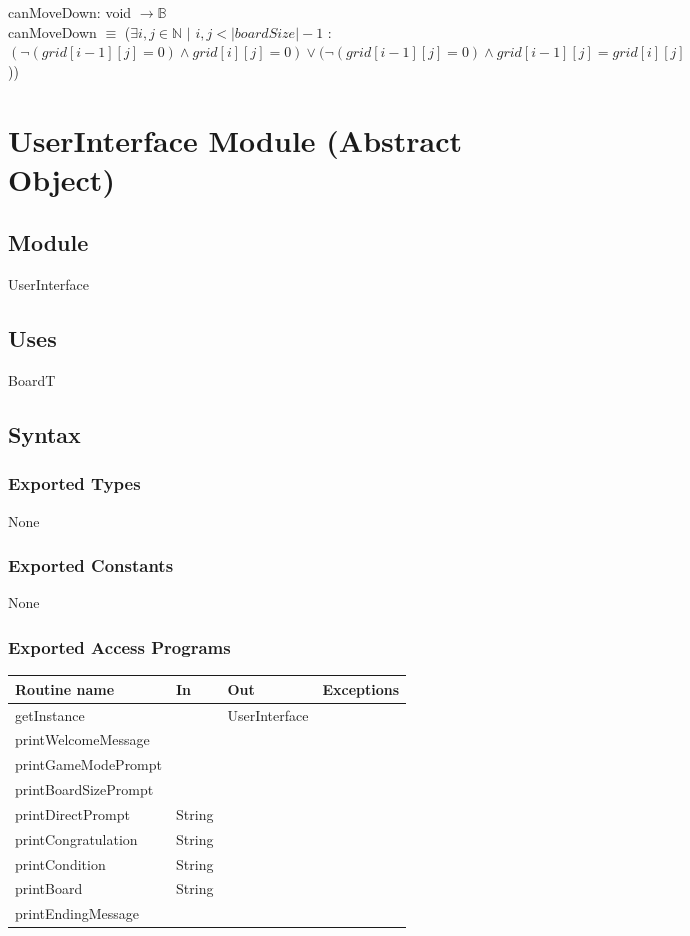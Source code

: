 \documentclass[12pt]{article}
\begin{document}
\noindent canMoveDown: void $\rightarrow \mathbb{B}$  \\
canMoveDown $\equiv$ ($\exists i, j \in \mathbb{N}$ $|$ $i,j < |boardSize|-1$ : $(\lnot(grid[i-1][j]=0) \wedge grid[i][j]=0) \vee (\lnot(grid[i-1][j]=0) \wedge grid[i-1][j]=grid[i][j]$))\\

\medskip

\newpage

\section* {UserInterface Module (Abstract Object)}

\subsection* {Module}

UserInterface

\subsection* {Uses}

BoardT

\subsection* {Syntax}

\subsubsection* {Exported Types}

None

\subsubsection* {Exported Constants}

None

\subsubsection* {Exported Access Programs}

\begin{tabular}{| l | l | l | p{6cm} |}
\hline
\textbf{Routine name} & \textbf{In} & \textbf{Out} & \textbf{Exceptions}\\
\hline
getInstance & ~ & UserInterface &  \\
\hline
printWelcomeMessage & ~ & ~ & \\
\hline
printGameModePrompt & ~ & ~ & \\
\hline
printBoardSizePrompt & ~ & ~ & \\
\hline
printDirectPrompt & String & ~ & \\
\hline
printCongratulation & String & ~ & \\
\hline
printCondition & String & ~ & \\
\hline
printBoard & String & ~ & \\
\hline
printEndingMessage & ~ & ~ & \\
\hline
\end{tabular}
\end{document}
